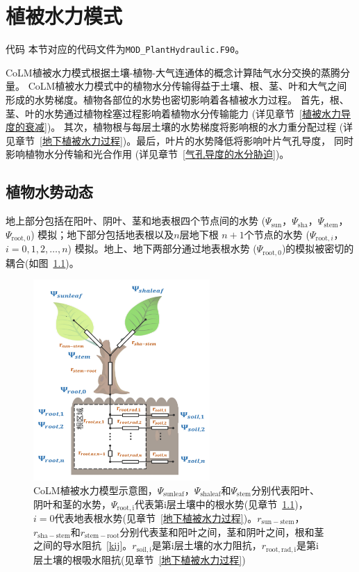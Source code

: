 \chapter{植被水力模式}
\begin{mymdframed}{代码}
  本节对应的代码文件为\texttt{MOD\_PlantHydraulic.F90}。
\end{mymdframed}

CoLM植被水力模式根据土壤-植物-大气连通体的概念计算陆气水分交换的蒸腾分量。
CoLM植被水力模式中的植物水分传输得益于土壤、根、茎、叶和大气之间形成的水势梯度。植物各部位的水势也密切影响着各植被水力过程。
首先，根、茎、叶的水势通过植物栓塞过程影响着植物水分传输能力 (详见章节~\ref{植被水力导度的衰减})。
其次，植物根与每层土壤的水势梯度将影响根的水力重分配过程 (详见章节~\ref{地下植被水力过程})。最后，叶片的水势降低将影响叶片气孔导度，
同时影响植物水分传输和光合作用 (详见章节~\ref{气孔导度的水分胁迫})。


\section{植物水势动态}\label{植物水势动态}
地上部分包括在阳叶、阴叶、茎和地表根四个节点间的水势 ($\Psi_{\mathrm{sun}}$，$\Psi_{\mathrm{sha}}$，$\Psi_{\mathrm{stem}}$，$\Psi_{\mathrm{root,0}}$)
%
模拟；地下部分包括地表根以及$n$层地下根 $n+1$个节点的水势 ($\Psi_{\mathrm{root},i}$，$i=0,1,2,\ldots,n$) 模拟。地上、地下两部分通过地表根水势
($\Psi_{\mathrm{root,0}}$)的模拟被密切的耦合(如图~\ref{fig:CoLM植被水力模型示意图})。

{
  \begin{figure}[htb]
    \centering
    \includegraphics[width=0.6\textwidth]{Figures/植被水力模式/CoLM植被水力模型示意图.png}
    \caption{CoLM植被水力模型示意图，$\Psi_{\mathrm{sunleaf}}$，$\Psi_{\mathrm{shaleaf}}$和$\Psi_{\mathrm{stem}}$分别代表阳叶、阴叶和茎的水势，$\Psi_{\mathrm{root,i}}$代表第i层土壤中的根水势(见章节~\ref{植物水势动态})，$i=0$代表地表根水势(见章节~\ref{地下植被水力过程})。$r_{\mathrm{sun-stem}}$，$r_{\mathrm{sha-stem}}$和$r_{\mathrm{stem-root}}$分别代表茎和阳叶之间，茎和阴叶之间，根和茎之间的导水阻抗~\eqref{kij}。$r_{\mathrm{soil,i}}$是第i层土壤的水力阻抗，$r_{\mathrm{root,rad,i}}$是第i层土壤的根吸水阻抗(见章节~\ref{地下植被水力过程})}
    \label{fig:CoLM植被水力模型示意图}
  \end{figure}
}



